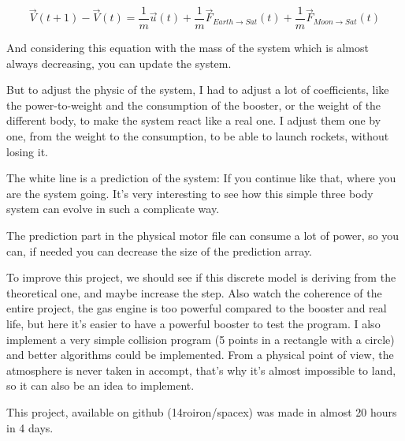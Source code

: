 \documentclass{scrartcl}
\begin{document}
$$\vec V(t+1) - \vec V(t)=\frac{1}{m}\vec u(t)+ \frac{1}{m}\vec F_{Earth \rightarrow Sat}(t) + \frac{1}{m}\vec F _{Moon \rightarrow Sat}(t)$$

And considering this equation with the mass of the system which is almost always decreasing, you can update the system.

But to adjust the physic of the system, I had to adjust a lot of coefficients, like the power-to-weight and the consumption of the booster, or the weight of the different body, to make the system react like a real one. I adjust them one by one, from the weight to the consumption, to be able to launch rockets, without losing it.

The white line is a prediction of the system: If you continue like that, where you are the system going. It's very interesting to see how this simple three body system can evolve in such a complicate way.



The prediction part in the physical motor file can consume a lot of power, so you can, if needed you can decrease the size of the prediction array.

To improve this project, we should see if this discrete model is deriving from the theoretical one, and maybe increase the step. Also watch the coherence of the entire project, the gas engine is too powerful compared to the booster and real life, but here it's easier to have a powerful booster to test the program.
I also implement a very simple collision program (5 points in a rectangle with a circle) and better algorithms could be implemented. From a physical point of view, the atmosphere is never taken in accompt, that's why it's almost impossible to land, so it can also be an idea to implement.

This project, available on github (14roiron/spacex) was made in almost 20 hours in 4 days.
\end{document}
